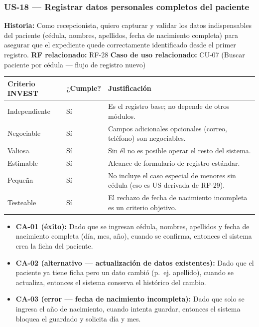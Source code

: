 \documentclass[11pt,a4paper]{article}
\providecommand{\tightlist}{%
	\setlength{\itemsep}{0pt}\setlength{\parskip}{0pt}}
\begin{document}
	\subsubsection{US-18 --- Registrar datos personales completos del paciente}
	
	\textbf{Historia:} Como recepcionista, quiero capturar y validar los datos indispensables del paciente (cédula, nombres, apellidos, fecha de nacimiento completa) para asegurar que el expediente quede correctamente identificado desde el primer registro.
	\textbf{RF relacionado:} RF-28
	\textbf{Caso de uso relacionado:} CU-07 (Buscar paciente por cédula --- flujo de registro nuevo)
	
	\begin{longtable}{p{} p{} p{}}
		
		
		\toprule
		\textbf{Criterio INVEST} &
		\textbf{¿Cumple?} &
		\textbf{Justificación} \\
		\midrule
		\endhead
		
		Independiente & Sí & Es el registro base; no depende de otros módulos. \\
		Negociable & Sí & Campos adicionales opcionales (correo, teléfono) son negociables. \\
		Valiosa & Sí & Sin él no es posible operar el resto del sistema. \\
		Estimable & Sí & Alcance de formulario de registro estándar. \\
		Pequeña & Sí & No incluye el caso especial de menores sin cédula (eso es US derivada de RF-29). \\
		Testeable & Sí & El rechazo de fecha de nacimiento incompleta es un criterio objetivo. \\
		\bottomrule
	\end{longtable}
	
	\begin{itemize}
		\tightlist
		\item
		\textbf{CA-01 (éxito):} Dado que se ingresan cédula, nombres, apellidos y fecha de nacimiento completa (día, mes, año), cuando se confirma, entonces el sistema crea la ficha del paciente.
		\item
		\textbf{CA-02 (alternativo --- actualización de datos existentes):} Dado que el paciente ya tiene ficha pero un dato cambió (p.~ej. apellido), cuando se actualiza, entonces el sistema conserva el histórico del cambio.
		\item
		\textbf{CA-03 (error --- fecha de nacimiento incompleta):} Dado que solo se ingresa el año de nacimiento, cuando intenta guardar, entonces el sistema bloquea el guardado y solicita día y mes.
	\end{itemize}
	
\end{document}
